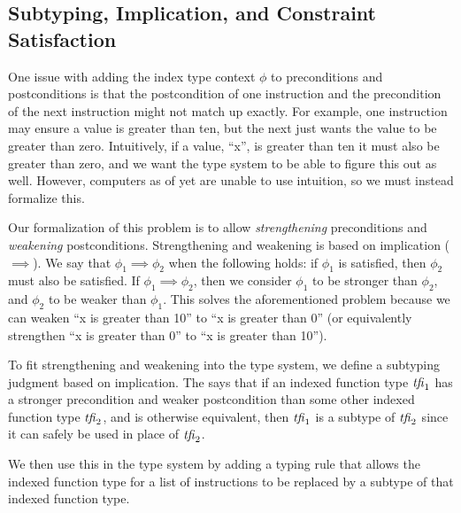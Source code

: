 \subsection{Subtyping, Implication, and Constraint Satisfaction}
\label{subsec:subtyping}
One issue with adding the index type context $\phi$ to preconditions and postconditions is that the postcondition of one instruction and the precondition of the next instruction might not match up exactly.
For example, one instruction may ensure a value is greater than ten, but the next just wants the value to be greater than zero.
Intuitively, if a value, ``x'', is greater than ten it must also be greater than zero, and we want the \name type system to be able to figure this out as well.
However, computers as of yet are unable to use intuition, so we must instead formalize this.

Our formalization of this problem is to allow \emph{strengthening} preconditions and \emph{weakening} postconditions.
Strengthening and weakening is based on implication ($\implies$).
We say that $\phi_1 \implies \phi_2$ when the following holds: if $\phi_1$ is satisfied, then $\phi_2$ must also be satisfied.
If $\phi_1 \implies \phi_2$, then we consider $\phi_1$ to be stronger than $\phi_2$, and $\phi_2$ to be weaker than $\phi_1$.
This solves the aforementioned problem because we can weaken ``x is greater than 10'' to ``x is greater than 0'' (or equivalently strengthen ``x is greater than 0'' to ``x is greater than 10'').

To fit strengthening and weakening into the type system, we define a subtyping judgment based on implication.
The  says that if an indexed function type $\tfi_1$ has a stronger precondition and weaker postcondition than some other indexed function type $\tfi_2$, and is otherwise equivalent, then $\tfi_1$ is a subtype of $\tfi_2$ since it can safely be used in place of $\tfi_2$.

\begin{mathpar}
\end{mathpar}

We then use this in the \name type system by adding a typing rule that allows the indexed function type for a list of instructions to be replaced by a subtype of that indexed function type.


